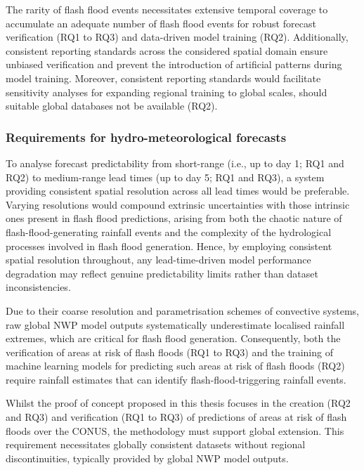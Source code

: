 The  rarity of flash flood events necessitates extensive temporal coverage to accumulate an adequate number of flash flood events for robust forecast verification (RQ1 to RQ3) and data-driven model training (RQ2). Additionally, consistent reporting standards across the considered spatial domain ensure unbiased verification and prevent the introduction of artificial patterns during model training. Moreover, consistent reporting standards would facilitate sensitivity analyses for expanding regional training to global scales, should suitable global databases not be available (RQ2).

\subsubsection{Requirements for hydro-meteorological forecasts}

To  analyse forecast predictability from short-range (i.e., up to day 1; RQ1 and RQ2) to medium-range lead times (up to day 5; RQ1 and RQ3), a system providing consistent spatial resolution across all lead times would be preferable. Varying resolutions would compound extrinsic uncertainties with those intrinsic ones present in flash flood predictions, arising from both the chaotic nature of flash-flood-generating rainfall events and the complexity of the hydrological processes involved in flash flood generation. Hence, by employing consistent spatial resolution throughout, any lead-time-driven model performance degradation may reflect genuine predictability limits rather than dataset inconsistencies.

Due  to their coarse resolution and parametrisation schemes of convective systems, raw global NWP model outputs systematically underestimate localised rainfall extremes, which are critical for flash flood generation. Consequently, both the verification of areas at risk of flash floods (RQ1 to RQ3) and the training of machine learning models for predicting such areas at risk of flash floods (RQ2) require rainfall estimates that can identify flash-flood-triggering rainfall events. 

Whilst  the proof of concept proposed in this thesis focuses in the creation (RQ2 and RQ3) and verification (RQ1 to RQ3) of predictions of areas at risk of flash floods over the CONUS, the methodology must support global extension. This requirement necessitates globally consistent datasets without regional discontinuities, typically provided by global NWP model outputs.


